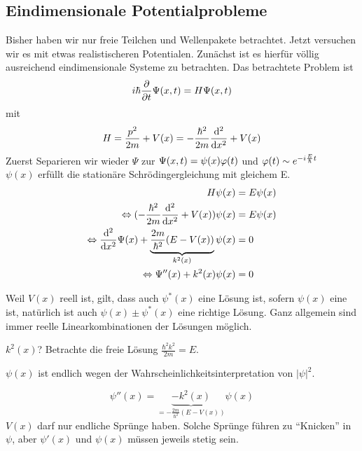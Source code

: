\subsection{Eindimensionale Potentialprobleme}
Bisher haben wir nur freie Teilchen und Wellenpakete betrachtet. Jetzt versuchen wir es mit etwas realistischeren Potentialen. Zunächst ist es hierfür völlig ausreichend eindimensionale Systeme zu betrachten. Das betrachtete Problem ist
$$i\hbar \frac{\partial}{\partial t} \Psi(x, t) = H \Psi(x, t)$$
mit
$$H = \frac{p^2}{2m} + V(x) = - \frac{\hbar^2}{2m} \frac{\mathrm d ^2}{\mathrm d x^2} + V(x)$$
Zuerst Separieren wir wieder $\Psi$ zur $\Psi(x, t) = \psi(x) \varphi(t)$ und $\varphi(t) \sim e^{-i \frac{E}{\hbar} t}$\\
$\psi(x)$ erfüllt die stationäre Schrödingergleichung mit gleichem E.
\begin{align*}
	H \psi(x) &= E \psi(x)\\
	\Leftrightarrow (- \frac{\hbar^2}{2m} \frac{\mathrm d ^2}{\mathrm d x^2} + V(x)) \psi(x) &= E \psi(x)\\
	\Leftrightarrow \frac{\mathrm d ^2}{\mathrm d x^2} \Psi(x) + \underbrace{\frac{2m}{\hbar^2}(E - V(x))}_{k^2(x)} \psi(x) &= 0\\
	\Leftrightarrow \Psi''(x) + k^2(x) \psi(x) &= 0
\end{align*}

\begin{bemerkung*}
	Weil $V(x)$ reell ist, gilt, dass auch $\psi^\ast(x)$ eine Lösung ist, sofern $\psi(x)$ eine ist, natürlich ist auch $\psi(x) \pm \psi^\ast(x)$ eine richtige Lösung. Ganz allgemein sind immer reelle Linearkombinationen der Lösungen möglich.
\end{bemerkung*}

\begin{bemerkung*}
	$k^2(x)$? Betrachte die freie Lösung $\frac{\hbar^2 k^2}{2m} = E$.
\end{bemerkung*}

\begin{bemerkung*}
	$\psi(x)$ ist endlich wegen der Wahrscheinlichkeitsinterpretation von $|\psi|^2$.
\end{bemerkung*}

\begin{bemerkung*}
	$$\psi''(x) = \underbrace{- k^2(x)}_{= - \frac{2m}{\hbar^2} (E - V(x))} \psi(x)$$
	$V(x)$ darf nur endliche Sprünge haben. Solche Sprünge führen zu "`Knicken"' in $\psi$, aber $\psi'(x)$ und $\psi(x)$ müssen jeweils stetig sein.
\end{bemerkung*}

